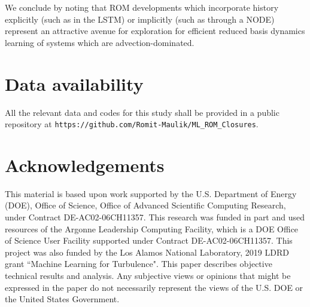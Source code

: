 \documentclass[preprint,12pt]{elsarticle}
\begin{document}
We conclude by noting that ROM developments which incorporate history explicitly (such as in the LSTM) or implicitly (such as through a NODE) represent an attractive avenue for exploration for efficient reduced basis dynamics learning of systems which are advection-dominated.

\section{Data availability}

All the relevant data and codes for this study shall be provided in a public repository at \texttt{https://github.com/Romit-Maulik/ML\_ROM\_Closures}.

\section{Acknowledgements}

This material is based upon work supported by the U.S. Department of Energy (DOE), Office of Science, Office of Advanced Scientific Computing Research, under Contract DE-AC02-06CH11357. This research was funded in part and used resources of the Argonne Leadership Computing Facility, which is a DOE Office of Science User Facility supported under Contract DE-AC02-06CH11357. This project was also funded by the Los Alamos National Laboratory, 2019 LDRD grant ``Machine Learning for Turbulence". This paper describes objective technical results and analysis. Any subjective views or opinions that might be expressed in the paper do not necessarily represent the views of the U.S. DOE or the United States Government.













\end{document}
